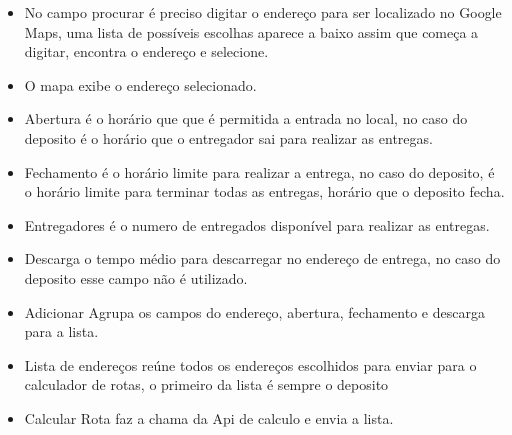 \begin{center}
	\label{fig:Interface}
\end{center}


\begin{itemize}
	\item No campo procurar é preciso digitar o endereço para ser localizado no Google Maps, uma lista de possíveis escolhas aparece a baixo assim que começa a digitar, encontra o endereço e selecione.
	\item O mapa exibe o endereço selecionado.
	\item Abertura é o horário que que é permitida a entrada no local, no caso do deposito é o horário que o entregador sai para realizar as entregas.
	\item Fechamento é o horário limite para realizar a entrega, no caso do deposito, é o horário limite para terminar todas as entregas, horário que o deposito fecha.
	\item Entregadores é o numero de entregados disponível para realizar as entregas.
	\item Descarga o tempo médio para descarregar no endereço de entrega, no caso do deposito esse campo não é utilizado.
	\item Adicionar Agrupa os campos do endereço, abertura, fechamento e descarga para a lista.
	\item Lista de endereços reúne todos os endereços escolhidos para enviar para o calculador de rotas, o primeiro da lista é sempre o deposito
	\item Calcular Rota faz a chama da Api de calculo e envia a lista.
\end{itemize}

